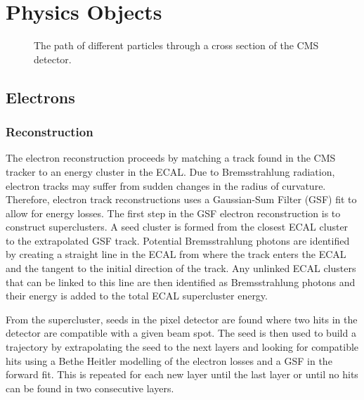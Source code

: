 \chapter{Physics Objects}


\begin{figure}[htb]
  \centering
  \caption{The path of different particles through a cross section of the CMS detector.}
  \label{phob:crosssec}
\end{figure}

\section{Electrons}


\subsection{Reconstruction}
The electron reconstruction proceeds by matching a track found in the CMS
tracker to an energy cluster in the ECAL.
Due to Bremsstrahlung radiation, electron tracks may suffer from sudden changes
in the radius of curvature. 
Therefore, electron track reconstructions uses a Gaussian-Sum Filter (GSF) fit
to allow for energy losses. 
The first step in the GSF electron reconstruction is to construct
superclusters.
A seed cluster is formed from the closest ECAL cluster to the extrapolated GSF
track. 
Potential Bremsstrahlung photons are identified by creating a straight line in
the ECAL from where the track enters the ECAL and the tangent to the initial
direction of the track. 
Any unlinked ECAL clusters that can be linked to this line are then identified
as Bremsstrahlung photons and their energy is added to the total ECAL
supercluster energy.\cite{eleReco}

From the supercluster, seeds in the pixel detector are found where two hits in
the detector are compatible with a given beam spot. The seed is then used to
build a trajectory by extrapolating the seed to the next layers and looking for
compatible hits using a Bethe Heitler modelling of the electron losses and a
GSF in the forward fit. This is repeated for each new layer until the last
layer or until no hits can be found in two consecutive layers.\cite{eleReco}

